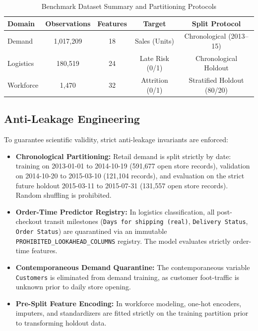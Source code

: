 \documentclass[conference]{IEEEtran}
\begin{document}
\begin{table}[htbp]
\caption{Benchmark Dataset Summary and Partitioning Protocols}
\begin{center}
\begin{tabular}{lcccc}
\toprule
\textbf{Domain} & \textbf{Observations} & \textbf{Features} & \textbf{Target} & \textbf{Split Protocol} \\
\midrule
Demand & 1,017,209 & 18 & Sales (Units) & Chronological (2013--15) \\
Logistics & 180,519 & 24 & Late Risk (0/1) & Chronological Holdout \\
Workforce & 1,470 & 32 & Attrition (0/1) & Stratified Holdout (80/20) \\
\bottomrule
\end{tabular}
\label{tab:datasets}
\end{center}
\end{table}

\subsection{Anti-Leakage Engineering}
To guarantee scientific validity, strict anti-leakage invariants are enforced:
\begin{itemize}
    \item \textbf{Chronological Partitioning:} Retail demand is split strictly by date: training on 2013-01-01 to 2014-10-19 (591,677 open store records), validation on 2014-10-20 to 2015-03-10 (121,104 records), and evaluation on the strict future holdout 2015-03-11 to 2015-07-31 (131,557 open store records). Random shuffling is prohibited.
    \item \textbf{Order-Time Predictor Registry:} In logistics classification, all post-checkout transit milestones (\texttt{Days for shipping (real)}, \texttt{Delivery Status}, \texttt{Order Status}) are quarantined via an immutable \texttt{PROHIBITED\_LOOKAHEAD\_COLUMNS} registry. The model evaluates strictly order-time features.
    \item \textbf{Contemporaneous Demand Quarantine:} The contemporaneous variable \texttt{Customers} is eliminated from demand training, as customer foot-traffic is unknown prior to daily store opening.
    \item \textbf{Pre-Split Feature Encoding:} In workforce modeling, one-hot encoders, imputers, and standardizers are fitted strictly on the training partition prior to transforming holdout data.
\end{itemize}
\end{document}
